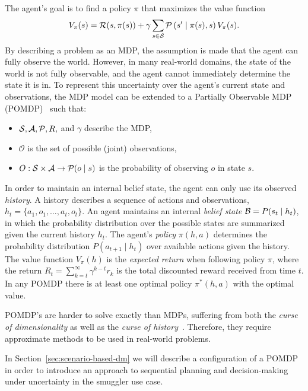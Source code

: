 \documentclass[conference]{IEEEtran}
\begin{document}
The agent's goal is to find a policy $\pi$ that maximizes the value function
\begin{equation}
V_{\pi}(s) = \R(s,\pi(s)) + \gamma\sum\limits_{s\in\S}\P\left(s'\mid\pi(s),s\right)V_{\pi}(s).
\end{equation} 
By describing a problem as an MDP, the assumption is made that the agent can fully observe the world. However, in many real-world domains, the state of the world is not fully observable, and the agent cannot immediately determine the state it is in. To represent this uncertainty over the agent's current state and observations, the MDP model can be extended to a Partially Observable MDP (POMDP)~\cite{aastrom1965optimal,pomdp} such that: 

\begin{itemize}
\item $\S,\mathcal{A},\P,R,$ and $\gamma$ describe the MDP,
\item $\mathcal{O}$ is the set of possible (joint) observations,
\item $O:\S\times\mathcal{A}\to\P(o\mid s)$ is the probability of observing $o$ in state $s$. 
\end{itemize}

In order to maintain an internal belief state, the agent can only use its observed \emph{history}. A history describes a sequence of actions and observations, $h_t = \{a_1, o_1, \ldots, a_t, o_t\}$. An agent maintains an internal {\it belief state} $\B = P(s_t\mid  h_t)$, in which the probability distribution over the possible states are summarized given the current history $h_t$. The agent's \emph{policy} $\pi(h,a)$ determines the probability distribution $P(a_{t+1}\mid h_t)$ over available actions given the history. The value function $V_{\pi}(h)$ is the {\it expected return} when following policy $\pi$, where the return $R_t = \sum\nolimits_{k=t}^{\infty} \gamma^{k−t}r_k$ is the total discounted reward received from time $t$. In any POMDP there is at least one optimal policy $\pi^*(h, a)$ with the optimal value.

POMDP's are harder to solve exactly than MDPs, suffering from both the {\it curse of dimensionality} as well as the {\it curse of history}~\cite{pineau2006anytime}. Therefore, they require approximate methods to be used in real-world problems.

In Section~\ref{sec:scenario-based-dm} we will describe a configuration of a POMDP in order to introduce an approach to sequential planning and decision-making under uncertainty in the smuggler use case. 
\end{document}
